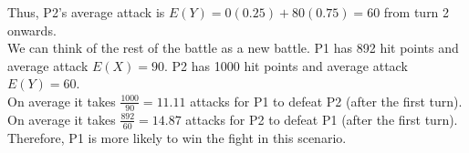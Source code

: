 \documentclass[12pt]{article}
\begin{document}
{\begin{minipage}[t]{0.98\textwidth}
\begin{minipage}[t]{0.47\textwidth}
\begin{enumerate}[a)]
    Thus, P2's average attack is $E(Y) = 0(0.25) + 80(0.75) = 60$ from turn 2 onwards.
    \\[0.4cm]
    We can think of the rest of the battle as a new battle. P1 has 892 hit points and average attack $E(X) = 90$. P2 has 1000 hit points and average attack $E(Y) = 60$.\\[0.4cm]
    On average it takes $\frac{1000}{90} = 11.11$ attacks for P1 to defeat P2 (after the first turn).\\[0.2cm]
    On average it takes $\frac{892}{60} = 14.87$ attacks for P2 to defeat P1 (after the first turn).\\[0.2cm]
    Therefore, P1 is more likely to win the fight in this scenario.
\end{enumerate}
\end{minipage}
\end{minipage}}\vspace{0.03\textwidth}
\end{document}
